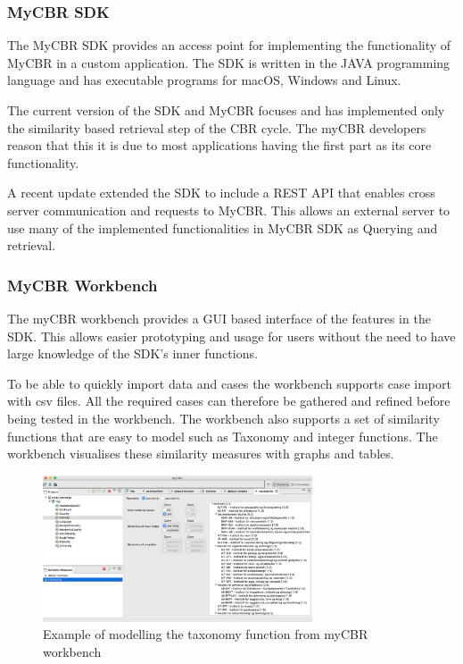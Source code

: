 \subsubsection{MyCBR SDK}
The MyCBR SDK provides an access point for implementing the functionality of MyCBR in a custom application. The SDK is written in the JAVA programming language and has executable programs for macOS, Windows and Linux\cite{MyCBR}. 

The current version of the SDK and MyCBR focuses and has implemented only the similarity based retrieval step of the CBR cycle. The myCBR developers reason that this it is due to most applications having the first part as its core functionality\cite{Stahl2008}.  

A recent update extended the SDK to include a REST API that enables cross server communication and requests to MyCBR. This allows an external server to use many of the implemented functionalities in MyCBR SDK as Querying and retrieval.

\subsubsection{MyCBR Workbench}

The myCBR workbench provides a GUI based interface of the features in the SDK. This allows easier prototyping and usage for users without the need to have large knowledge of the SDK's inner functions\cite{bach2014knowledge}. 

To be able to quickly import data and cases the workbench supports case import with csv files. All the required cases can therefore be gathered and refined before being tested in the workbench. The workbench also supports a set of similarity functions that are easy to model such as Taxonomy and integer functions. The workbench visualises these similarity measures with graphs and tables.

\begin{figure}[H]
    \centering
    \includegraphics[width=8cm]{fig/myCBRworkbench.png}
    \caption{Example of modelling the taxonomy function from myCBR workbench}
\end{figure}



